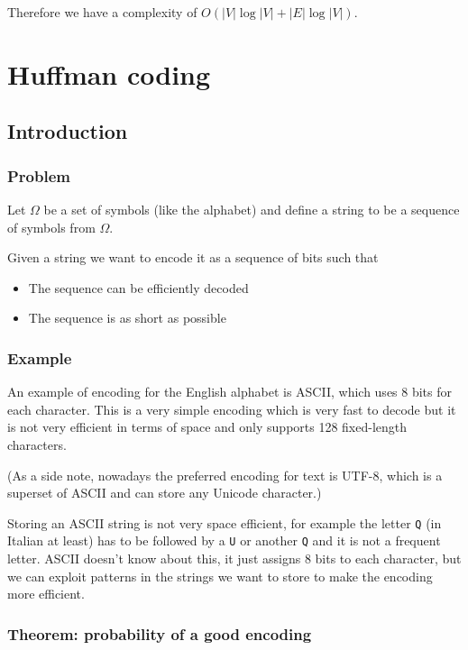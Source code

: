 \documentclass[12pt]{extarticle}
\begin{document}
Therefore we have a complexity of $O(|V| \log |V| + |E| \log |V|)$.

\section{Huffman coding}

\subsection{Introduction}

\subsubsection{Problem}

Let $\Omega$ be a set of symbols (like the alphabet) and define a string to be a sequence of symbols from $\Omega$.

Given a string we want to encode it as a sequence of bits such that

\begin{itemize}
    \item The sequence can be efficiently decoded
    \item The sequence is as short as possible
\end{itemize}

\subsubsection{Example}

An example of encoding for the English alphabet is ASCII, which uses 8 bits for each character.
This is a very simple encoding which is very fast to decode but it is not very efficient in terms of space and only supports 128 fixed-length characters.

(As a side note, nowadays the preferred encoding for text is UTF-8, which is a superset of ASCII and can store any Unicode character.)

Storing an ASCII string is not very space efficient, for example the letter \texttt{Q} (in Italian at least) has to be followed by a \texttt{U} or another \texttt{Q} and it is not a frequent letter.
ASCII doesn't know about this, it just assigns 8 bits to each character, but we can exploit patterns in the strings we want to store to make the encoding more efficient.

\subsubsection{Theorem: probability of a good encoding}
\end{document}
